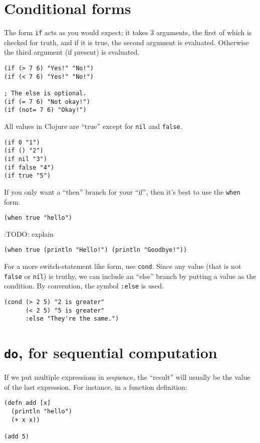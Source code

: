 \documentclass[11pt]{article}
\begin{document}
\section{Conditional forms}
\label{sec:org4152811}
The form \texttt{if} acts as you would expect; it takes 3 arguments,
the first of which is checked for truth,
and if it is true, the second argument is evaluated.
Otherwise the third argument (if present) is evaluated.
\begin{verbatim}
(if (> 7 6) "Yes!" "No!")
(if (< 7 6) "Yes!" "No!")

; The else is optional.
(if (= 7 6) "Not okay!")
(if (not= 7 6) "Okay!")
\end{verbatim}

All values in Clojure are “true” except for \texttt{nil} and \texttt{false}.
\begin{verbatim}
(if 0 "1")
(if () "2")
(if nil "3")
(if false "4")
(if true "5")
\end{verbatim}

If you only want a “then” branch for your “if”,
then it's best to use the \texttt{when} form.
\begin{verbatim}
(when true "hello")
\end{verbatim}

:TODO: explain
\begin{verbatim}
(when true (println "Hello!") (println "Goodbye!"))
\end{verbatim}

For a more switch-statement like form, use \texttt{cond}.
Since any value (that is not \texttt{false} or \texttt{nil}) is truthy,
we can include an “else” branch by putting a value
as the condition. By convention, the symbol \texttt{:else} is used.
\begin{verbatim}
(cond (> 2 5) "2 is greater"
      (< 2 5) "5 is greater"
      :else "They're the same.")
\end{verbatim}

\section{\texttt{do}, for sequential computation}
\label{sec:org9c29280}
If we put multiple expressions in sequence,
the “result” will usually be the value of the last expression.
For instance, in a function definition:
\begin{verbatim}
(defn add [x]
  (println "hello")
  (+ x x))

(add 5)
\end{verbatim}
\end{document}
